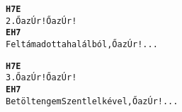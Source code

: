 \newpage
{}
\kottastart
{}
\kottaend
\begin{minipage}{\textwidth}
\begin{multicols}{2}
\begin{minipage}{\textwidth}
\begin{alltt}
\textbf{        H7       E}
2. Ő az Úr! Ő az Úr!
\textbf{         E                      H7}
   Feltámadott a halálból, Ő az Úr! ...
\end{alltt}
\vspace{0.0cm}
\versszakspacing
\end{minipage}
\begin{minipage}{\textwidth}
\begin{alltt}
\textbf{        H7       E}
3. Ő az Úr! Ő az Úr!
\textbf{          E                        H7}
   Betölt engem Szentlelkével,Ő az Úr! ...
\end{alltt}
\vspace{0.0cm}
\versszakspacing
\end{minipage}
\vspace{0.2cm}
\end{multicols}
\end{minipage}

